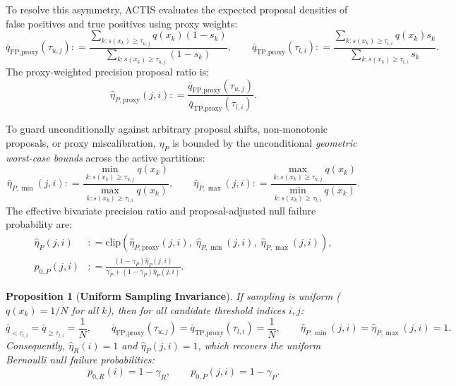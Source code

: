 \documentclass[11pt,a4paper]{article}
\newcommand{\coloneqq}{\mathrel{\mathop:}=}
\newtheorem{proposition}[theorem]{Proposition}
\begin{document}
To resolve this asymmetry, ACTIS evaluates the expected proposal densities of false positives and true positives using proxy weights:
\begin{equation}
\bar{q}_{\text{FP}, \text{proxy}}(\tau_{u, j}) \coloneqq \frac{\sum_{k: s(x_k) \ge \tau_{u, j}} q(x_k)(1 - s_k)}{\sum_{k: s(x_k) \ge \tau_{u, j}} (1 - s_k)}, \qquad
\bar{q}_{\text{TP}, \text{proxy}}(\tau_{l, i}) \coloneqq \frac{\sum_{k: s(x_k) \ge \tau_{l, i}} q(x_k) s_k}{\sum_{k: s(x_k) \ge \tau_{l, i}} s_k}.
\end{equation}
The proxy-weighted precision proposal ratio is:
\begin{equation}
\hat{\eta}_{P, \text{proxy}}(j, i) \coloneqq \frac{\bar{q}_{\text{FP}, \text{proxy}}(\tau_{u, j})}{\bar{q}_{\text{TP}, \text{proxy}}(\tau_{l, i})}.
\end{equation}

To guard unconditionally against arbitrary proposal shifts, non-monotonic proposals, or proxy miscalibration, $\eta_P$ is bounded by the unconditional \emph{geometric worst-case bounds} across the active partitions:
\begin{equation}
\hat{\eta}_{P, \min}(j, i) \coloneqq \frac{\min_{k: s(x_k) \ge \tau_{u, j}} q(x_k)}{\max_{k: s(x_k) \ge \tau_{l, i}} q(x_k)}, \qquad
\hat{\eta}_{P, \max}(j, i) \coloneqq \frac{\max_{k: s(x_k) \ge \tau_{u, j}} q(x_k)}{\min_{k: s(x_k) \ge \tau_{l, i}} q(x_k)}.
\end{equation}
The effective bivariate precision ratio and proposal-adjusted null failure probability are:
\begin{align}
\hat{\eta}_P(j, i) &\coloneqq \mathrm{clip}\left(\hat{\eta}_{P, \text{proxy}}(j, i), \; \hat{\eta}_{P, \min}(j, i), \; \hat{\eta}_{P, \max}(j, i)\right), \label{eq:eta_P_def} \\
p_{0, P}(j, i) &\coloneqq \frac{(1 - \gamma_P)\hat{\eta}_P(j, i)}{\gamma_P + (1 - \gamma_P)\hat{\eta}_P(j, i)}. \label{eq:p0_P_def}
\end{align}

\begin{proposition}[\textbf{Uniform Sampling Invariance}]\label{prop:uniform_invariance}
If sampling is uniform ($q(x_k) = 1/N$ for all $k$), then for all candidate threshold indices $i, j$:
\begin{equation}
\bar{q}_{< \tau_{l, i}} = \bar{q}_{\ge \tau_{l, i}} = \frac{1}{N}, \qquad \bar{q}_{\text{FP}, \text{proxy}}(\tau_{u, j}) = \bar{q}_{\text{TP}, \text{proxy}}(\tau_{l, i}) = \frac{1}{N}, \qquad \hat{\eta}_{P, \min}(j, i) = \hat{\eta}_{P, \max}(j, i) = 1.
\end{equation}
Consequently, $\hat{\eta}_R(i) = 1$ and $\hat{\eta}_P(j, i) = 1$, which recovers the uniform Bernoulli null failure probabilities:
\begin{equation}
p_{0, R}(i) = 1 - \gamma_R, \qquad p_{0, P}(j, i) = 1 - \gamma_P.
\end{equation}
\end{proposition}
\end{document}
